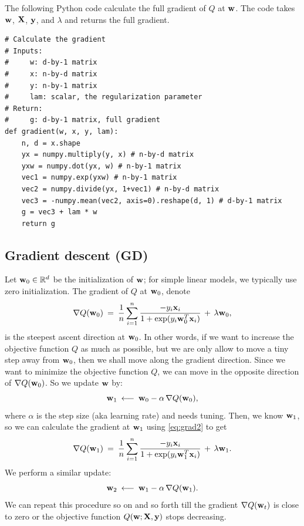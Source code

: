 \documentclass[11pt]{article}
\numberwithin{equation}{section}
\def\w{{\bf w}}
\def\X{{\bf X}}
\def\x{{\bf x}}
\def\y{{\bf y}}
\def\RB{{\mathbb R}}
\begin{document}
The following Python code calculate the full gradient of $Q $ at $\w$.
The code takes $\w$, $\X$, $\y$, and $\lambda$ and returns the full gradient.

\vspace{3mm}
\begin{lstlisting}
# Calculate the gradient
# Inputs:
#     w: d-by-1 matrix
#     x: n-by-d matrix
#     y: n-by-1 matrix
#     lam: scalar, the regularization parameter
# Return:
#     g: d-by-1 matrix, full gradient
def gradient(w, x, y, lam):
	n, d = x.shape
	yx = numpy.multiply(y, x) # n-by-d matrix
	yxw = numpy.dot(yx, w) # n-by-1 matrix
	vec1 = numpy.exp(yxw) # n-by-1 matrix
	vec2 = numpy.divide(yx, 1+vec1) # n-by-d matrix
	vec3 = -numpy.mean(vec2, axis=0).reshape(d, 1) # d-by-1 matrix
	g = vec3 + lam * w
	return g
\end{lstlisting}
\vspace{3mm}



\subsection{Gradient descent (GD)}

Let $\w_0 \in \RB^d$ be the initialization of $\w$;
for simple linear models, we typically use zero initialization.
The gradient of $Q$ at $\w_0$, denote 
\begin{equation*}
\nabla Q (\w_0)
\: = \: \frac{1}{n} \sum_{i=1}^n \frac{ - y_i \x_i }{1+\exp({y_i \w_0^T \x_i})} \, + \, \lambda \w_0 ,
\end{equation*} 
is the steepest ascent direction at $\w_0$.
In other words, if we want to increase the objective function $Q$ as much as possible, but we are only allow to move a tiny step away from $\w_0$, then we shall move along the gradient direction.
Since we want to minimize the objective function $Q$, we can move in the opposite direction of $\nabla Q (\w_0)$.
So we update $\w$ by:
\begin{equation*}
\w_1 \: \longleftarrow \:
\w_0 - \alpha \, \nabla Q (\w_0),
\end{equation*}
where $\alpha$ is the step size (aka learning rate) and needs tuning.
Then, we know $\w_1$, so we can calculate the gradient at $\w_1$ using \eqref{eq:grad2} to get 
\begin{equation*}
\nabla Q (\w_1)
\: = \: \frac{1}{n} \sum_{i=1}^n \frac{ - y_i \x_i }{1+\exp({y_i \w_1^T \x_i})} \, + \, \lambda \w_1 .
\end{equation*} 
We perform a similar update:
\begin{equation*}
\w_2 \: \longleftarrow \:
\w_1 - \alpha \, \nabla Q (\w_1).
\end{equation*}
We can repeat this procedure so on and so forth till the gradient $\nabla Q (\w_t)$ is close to zero or the objective function $Q (\w; \X, \y)$ stops decreasing.
\end{document}
